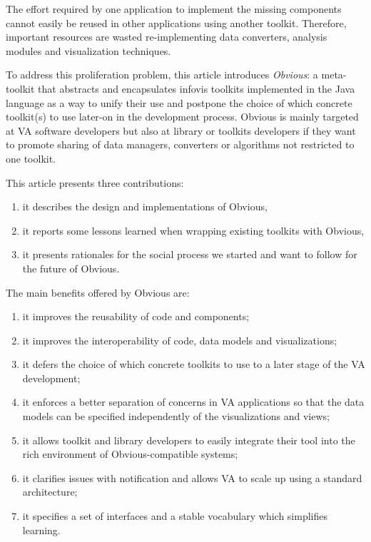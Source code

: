 The effort required by one application to implement the missing
components cannot easily be reused in other applications using another
toolkit.  Therefore, important resources are wasted re-implementing
data converters, analysis modules and visualization techniques. 

To address this proliferation problem, this article introduces
\emph{Obvious}: a meta-toolkit that abstracts and encapsulates infovis
toolkits implemented in the Java language as a way to unify their use
and postpone the choice of which concrete toolkit(s) to use later-on
in the development process.  Obvious is mainly targeted at VA software
developers but also at library or toolkits developers if they want to
promote sharing of data managers, converters or algorithms not
restricted to one toolkit.

This article presents three contributions:
\begin{enumerate}[noitemsep]
\item it describes the design and implementations of Obvious,
\item it reports some lessons learned when wrapping existing toolkits
  with Obvious,
\item it presents rationales for the social process we started and
  want to follow for the future of Obvious.
\end{enumerate}

The main benefits offered by Obvious are:
\begin{enumerate}[noitemsep]
\item it improves the reusability of code and components;
\item it improves the interoperability of code, data models and
  visualizations;
\item it defers the choice of which concrete toolkits to use to a
  later stage of the VA development;
\item it enforces a better separation of concerns in VA
  applications so that the data models can be specified independently
  of the visualizations and views;
\item it allows toolkit and library developers to easily integrate
  their tool into the rich environment of Obvious-compatible systems;
\item it clarifies issues with notification and allows VA to scale up using a standard architecture;
\item it specifies a set of interfaces and a stable vocabulary which
  simplifies learning.
\end{enumerate}

